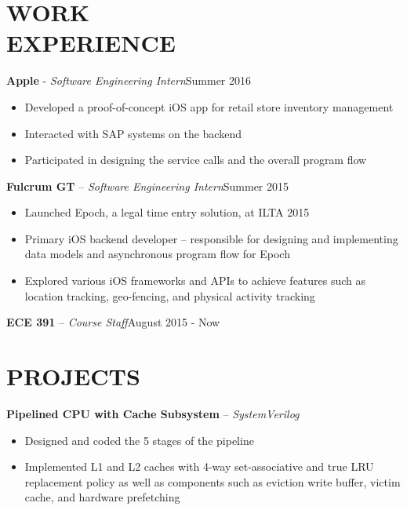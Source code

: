 \documentclass[resmargin]{res}
\begin{document}
\begin{resume}
\vspace{-3mm}
\section{WORK \\ EXPERIENCE} 
{\bf Apple} - {\sl Software Engineering Intern}\hfill Summer 2016
	\begin{itemize} \itemsep -1pt
	\item Developed a proof-of-concept iOS app for retail store inventory management
	\item Interacted with SAP systems on the backend
	\item Participated in designing the service calls and the overall program flow 
\end{itemize}

\vspace{-3mm}
{\bf Fulcrum GT} -- {\sl Software Engineering Intern}\hfill Summer 2015
	\begin{itemize} \itemsep -1pt
	\item Launched Epoch, a legal time entry solution, at ILTA 2015
	\item Primary iOS backend developer -- responsible for designing and implementing data models and asynchronous program flow for Epoch
	\item Explored various iOS frameworks and APIs to achieve features such as location tracking, geo-fencing, and physical activity tracking
\end{itemize}
	
\vspace{-3mm}
{\bf ECE 391} -- {\sl Course Staff}\hfill August 2015 - Now
 
\vspace{-3mm}
\section{PROJECTS} 

{\bf Pipelined CPU with Cache Subsystem} -- {\sl SystemVerilog} 
\begin{itemize} \itemsep -1pt
    \item Designed and coded the 5 stages of the pipeline 
    \item Implemented L1 and L2 caches with 4-way set-associative and true LRU replacement policy as well as components such as eviction write buffer, victim cache, and hardware prefetching
\end{itemize}


\end{resume}
\end{document}

